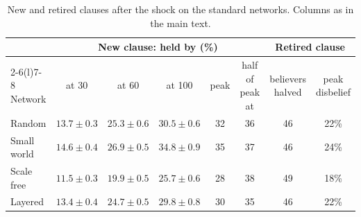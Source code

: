 \documentclass[11pt]{article}
\begin{document}
\begin{table}[H]
\centering
\caption{New and retired clauses after the shock on the standard networks. Columns as in the main text.}
\label{tab:A-clauses}
\footnotesize
\begin{tabular}{@{}lccccccc@{}}
\toprule
 & \multicolumn{5}{c}{New clause: held by (\%)} & \multicolumn{2}{c}{Retired clause} \\
\cmidrule(lr){2-6}\cmidrule(l){7-8}
Network & at 30 & at 60 & at 100 & peak & half of peak at & believers halved & peak disbelief \\
\midrule
Random      & $13.7 \pm 0.3$ & $25.3 \pm 0.6$ & $30.5 \pm 0.6$ & 32 & 36 & 46 & 22\% \\
Small world & $14.6 \pm 0.4$ & $26.9 \pm 0.5$ & $34.8 \pm 0.9$ & 35 & 37 & 46 & 24\% \\
Scale free  & $11.5 \pm 0.3$ & $19.9 \pm 0.5$ & $25.7 \pm 0.6$ & 28 & 38 & 49 & 18\% \\
Layered     & $13.4 \pm 0.4$ & $24.7 \pm 0.5$ & $29.8 \pm 0.8$ & 30 & 35 & 46 & 22\% \\
\bottomrule
\end{tabular}
\end{table}
\end{document}
